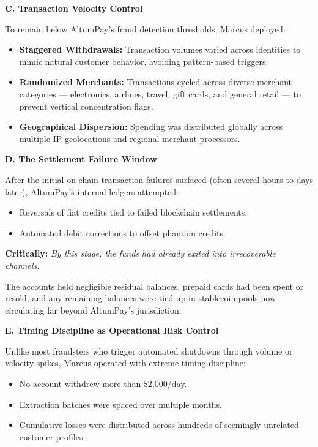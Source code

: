 \medskip

\textbf{C. Transaction Velocity Control}

To remain below AltumPay's fraud detection thresholds, Marcus deployed:

\begin{itemize}
    \item \textbf{Staggered Withdrawals:}  
    Transaction volumes varied across identities to mimic natural customer behavior, avoiding pattern-based triggers.

    \item \textbf{Randomized Merchants:}  
    Transactions cycled across diverse merchant categories --- electronics, airlines, travel, gift cards, and general retail --- to prevent vertical concentration flags.

    \item \textbf{Geographical Dispersion:}  
    Spending was distributed globally across multiple IP geolocations and regional merchant processors.
\end{itemize}

\medskip

\textbf{D. The Settlement Failure Window}

After the initial on-chain transaction failures surfaced (often several hours to days later), AltumPay’s internal ledgers attempted:

\begin{itemize}
    \item Reversals of fiat credits tied to failed blockchain settlements.
    \item Automated debit corrections to offset phantom credits.
\end{itemize}

\medskip

\textbf{Critically:}  
\textit{By this stage, the funds had already exited into irrecoverable channels.}

The accounts held negligible residual balances, prepaid cards had been spent or resold, and any remaining balances were tied up in stablecoin pools now circulating far beyond AltumPay’s jurisdiction.

\medskip

\textbf{E. Timing Discipline as Operational Risk Control}

Unlike most fraudsters who trigger automated shutdowns through volume or velocity spikes, Marcus operated with extreme timing discipline:

\begin{itemize}
    \item No account withdrew more than \$2,000/day.
    \item Extraction batches were spaced over multiple months.
    \item Cumulative losses were distributed across hundreds of seemingly unrelated customer profiles.
\end{itemize}


